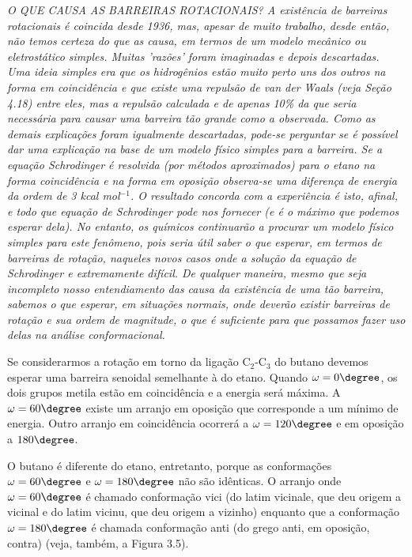 \par\bigskip
\emph{O QUE CAUSA AS BARREIRAS ROTACIONAIS? A existência de barreiras rotacionais é coincida desde 1936, mas, apesar de muito trabalho, desde então, não temos certeza do que as causa, em termos de um modelo mecânico ou eletrostático simples. Muitas 'razões' foram imaginadas e depois descartadas. Uma ideia simples era que os hidrogênios estão muito perto uns dos outros na forma em coincidência e que existe uma repulsão de van der Waals (veja Seção 4.18) entre eles, mas a repulsão calculada e de apenas 10\% da que seria necessária para causar uma barreira tão grande como a observada. Como as demais explicações foram igualmente descartadas, pode-se perguntar se é possível dar uma explicação na base de um modelo físico simples para a barreira. Se a equação Schrodinger é resolvida (por métodos aproximados) para o etano na forma coincidência e na forma em oposição observa-se uma diferença de energia da ordem de 3 kcal mol$^{-1}$. O resultado concorda com a experiência é isto, afinal, e todo que equação de Schrodinger pode nos fornecer (e é o máximo que podemos esperar dela). No entanto, os químicos continuarão a procurar um modelo físico simples para este fenômeno, pois seria útil saber o que esperar, em termos de barreiras de rotação, naqueles novos casos onde a solução da equação de Schrodinger e extremamente difícil. De qualquer maneira, mesmo que seja incompleto nosso entendiamento das causa da existência de uma tão barreira, sabemos o que esperar, em situações normais, onde deverão existir barreiras de rotação e sua ordem de magnitude, o que é suficiente para que possamos fazer uso delas na análise conformacional.}
\par\bigskip

Se considerarmos a rotação em torno da ligação C$_2$-C$_3$ do butano devemos esperar uma barreira senoidal semelhante à do etano. Quando $\omega = 0\degree$, os dois grupos metila estão em coincidência e a energia será máxima. A $\omega = 60\degree$ existe um arranjo em oposição que corresponde a um mínimo de energia. Outro arranjo em coincidência ocorrerá a $\omega = 120\degree$ e em oposição a $180\degree$.

O butano é diferente do etano, entretanto, porque as conformações $\omega =60\degree$ e $\omega=180\degree$ não são idênticas. O arranjo onde $\omega=60\degree$ é chamado conformação vici (do latim vicinale, que deu origem a vicinal e do latim vicinu, que deu origem a vizinho) enquanto que a conformação $\omega=180\degree$ é chamada conformação anti (do grego anti, em oposição, contra) (veja, também, a Figura 3.5).

